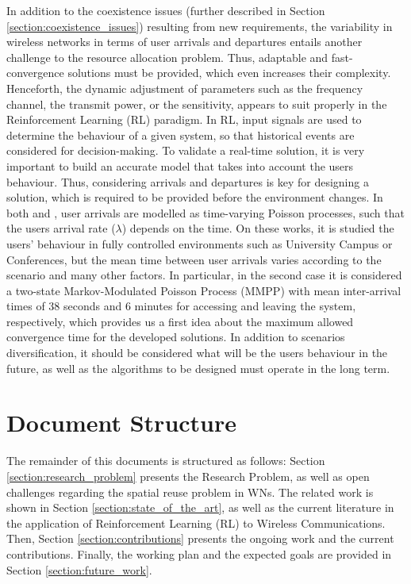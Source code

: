 \documentclass[12pt, a4paper,twoside]{tesi_upf}
\begin{document}
		In addition to the coexistence issues (further described in Section \ref{section:coexistence_issues}) resulting from new requirements, the variability in wireless networks in terms of user arrivals and departures entails another challenge to the resource allocation problem. Thus, adaptable and fast-convergence solutions must be provided, which even increases their complexity. Henceforth, the dynamic adjustment of parameters such as the frequency channel, the transmit power, or the sensitivity, appears to suit properly in the Reinforcement Learning (RL) paradigm. In RL, input signals are used to determine the behaviour of a given system, so that historical events are considered for decision-making. To validate a real-time solution, it is very important to build an accurate model that takes into account the users behaviour. Thus, considering arrivals and departures is key for designing a solution, which is required to be provided before the environment changes. In both \cite{balachandran2002characterizing} and \cite{papadopouli2005modeling}, user arrivals are modelled as time-varying Poisson processes, such that the users arrival rate ($\lambda$) depends on the time. On these works, it is studied the users' behaviour in fully controlled environments such as University Campus or Conferences, but the mean time between user arrivals varies according to the scenario and many other factors. In particular, in the second case it is considered a two-state Markov-Modulated Poisson Process (MMPP) with mean inter-arrival times of 38 seconds and 6 minutes for accessing and leaving the system, respectively, which provides us a first idea about the maximum allowed convergence time for the developed solutions. In addition to scenarios diversification, it should be considered what will be the users behaviour in the future, as well as the algorithms to be designed must operate in the long term. 
		
		\section{Document Structure}
			The remainder of this documents is structured as follows: Section \ref{section:research_problem} presents the Research Problem, as well as open challenges regarding the spatial reuse problem in WNs. The related work is shown in Section \ref{section:state_of_the_art}, as well as the current literature in the application of Reinforcement Learning (RL) to Wireless Communications. Then, Section \ref{section:contributions} presents the ongoing work and the current contributions. Finally, the working plan and the expected goals are provided in Section \ref{section:future_work}.
\end{document}
